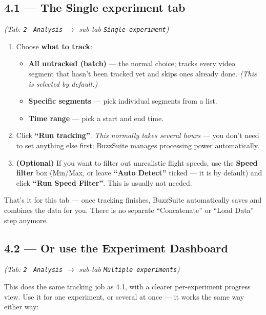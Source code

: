 \documentclass[11pt,a4paper]{article}
\begin{document}
\subsection*{4.1 --- The Single experiment tab}
\textit{(Tab: \texttt{2} \textperiodcentered\ \texttt{Analysis} $\to$ sub-tab \texttt{Single experiment})}

\begin{enumerate}[leftmargin=*]
  \item Choose \textbf{what to track}:
  \begin{itemize}
    \item \textbf{All untracked (batch)} --- the normal choice; tracks every video segment that
          hasn't been tracked yet and skips ones already done. \emph{(This is selected by
          default.)}
    \item \textbf{Specific segments} --- pick individual segments from a list.
    \item \textbf{Time range} --- pick a start and end time.
  \end{itemize}

  \item Click \textbf{``Run tracking''}. \emph{This normally takes several hours} --- you don't
        need to set anything else first; BuzzSuite manages processing power automatically.

  \item \textbf{(Optional)} If you want to filter out unrealistic flight speeds, use the
        \textbf{Speed filter} box (Min/Max, or leave \textbf{``Auto Detect''} ticked --- it is by
        default) and click \textbf{``Run Speed Filter''}. This is usually not needed.
\end{enumerate}

That's it for this tab --- once tracking finishes, BuzzSuite automatically saves and combines the
data for you. There is no separate ``Concatenate'' or ``Load Data'' step anymore.

\subsection*{4.2 --- Or use the Experiment Dashboard}
\textit{(Tab: \texttt{2} \textperiodcentered\ \texttt{Analysis} $\to$ sub-tab \texttt{Multiple experiments})}

This does the same tracking job as 4.1, with a clearer per-experiment progress view. Use it for
one experiment, or several at once --- it works the same way either way:
\end{document}
